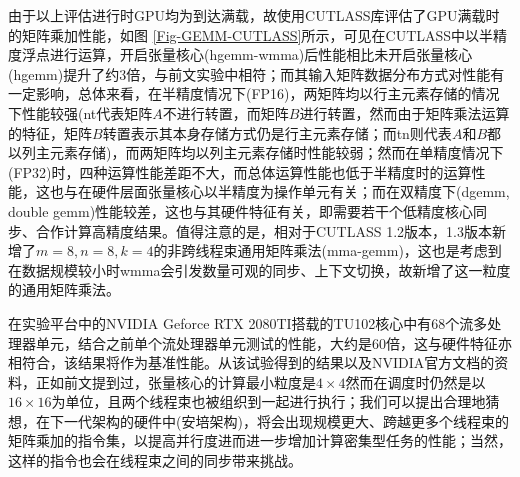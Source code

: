 \par 由于以上评估进行时GPU均为到达满载，故使用CUTLASS库评估了GPU满载时的矩阵乘加性能，如图 \ref{Fig-GEMM-CUTLASS}所示，可见在CUTLASS中以半精度浮点进行运算，开启张量核心(hgemm-wmma)后性能相比未开启张量核心(hgemm)提升了约3倍，与前文实验中相符；而其输入矩阵数据分布方式对性能有一定影响，总体来看，在半精度情况下(FP16)，两矩阵均以行主元素存储的情况下性能较强(nt代表矩阵$ A $不进行转置，而矩阵$ B $进行转置，然而由于矩阵乘法运算的特征，矩阵$ B $转置表示其本身存储方式仍是行主元素存储；而tn则代表$ A $和$ B $都以列主元素存储)，而两矩阵均以列主元素存储时性能较弱；然而在单精度情况下(FP32)时，四种运算性能差距不大，而总体运算性能也低于半精度时的运算性能，这也与在硬件层面张量核心以半精度为操作单元有关；而在双精度下(dgemm, double gemm)性能较差，这也与其硬件特征有关，即需要若干个低精度核心同步、合作计算高精度结果。值得注意的是，相对于CUTLASS 1.2版本，1.3版本新增了$ m=8,n=8,k=4 $的非跨线程束通用矩阵乘法(mma-gemm)，这也是考虑到在数据规模较小时wmma会引发数量可观的同步、上下文切换，故新增了这一粒度的通用矩阵乘法。
\par 在实验平台中的NVIDIA Geforce RTX 2080TI搭载的TU102核心中有68个流多处理器单元\cite{2080TI}，结合之前单个流处理器单元测试的性能，大约是60倍，这与硬件特征亦相符合，该结果将作为基准性能。从该试验得到的结果以及NVIDIA官方文档的资料，正如前文提到过，张量核心的计算最小粒度是$ 4\times 4 $然而在调度时仍然是以$ 16\times 16 $为单位，且两个线程束也被组织到一起进行执行；我们可以提出合理地猜想，在下一代架构的硬件中(安培架构)，将会出现规模更大、跨越更多个线程束的矩阵乘加的指令集，以提高并行度进而进一步增加计算密集型任务的性能；当然，这样的指令也会在线程束之间的同步带来挑战。

